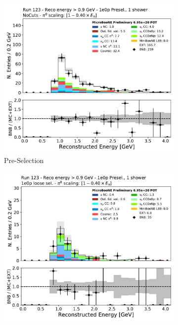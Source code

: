 \begin{figure}[H]
    \centering
    \begin{subfigure}{0.3\textwidth}
    \includegraphics[width=1.0\textwidth]{1e0p/High_E_Sideband/reco_e_extended.pdf}
    \caption{Pre-Selection}
    \end{subfigure}
    \begin{subfigure}{0.3\textwidth}
    \includegraphics[width=1.0\textwidth]{1e0p/High_E_Sideband/loose_selection/reco_e_extended.pdf}

\end{subfigure}
\end{figure}
